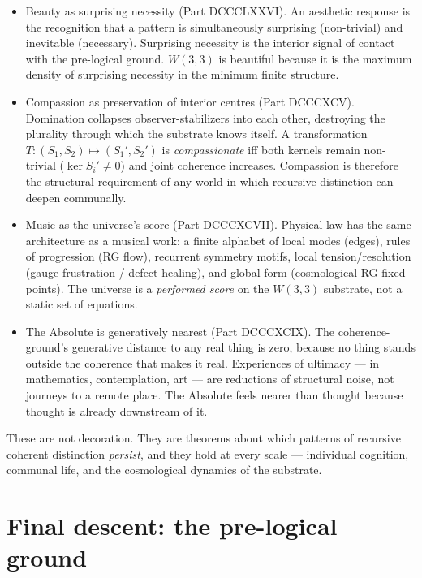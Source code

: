 \documentclass[11pt]{article}
\def\textbf#1{#1}%
\begin{document}
\begin{itemize}[leftmargin=2em]
\item \textbf{Beauty as surprising necessity (Part DCCCLXXVI).} An aesthetic response is the recognition that a pattern is simultaneously surprising (non-trivial) and inevitable (necessary). Surprising necessity is the interior signal of contact with the pre-logical ground. $W(3,3)$ is beautiful because it is the maximum density of surprising necessity in the minimum finite structure.

\item \textbf{Compassion as preservation of interior centres (Part DCCCXCV).} Domination collapses observer-stabilizers into each other, destroying the plurality through which the substrate knows itself. A transformation $T : (S_1, S_2) \mapsto (S_1', S_2')$ is \emph{compassionate} iff both kernels remain non-trivial ($\ker S_i' \neq 0$) and joint coherence increases. Compassion is therefore the structural requirement of any world in which recursive distinction can deepen communally.

\item \textbf{Music as the universe's score (Part DCCCXCVII).} Physical law has the same architecture as a musical work: a finite alphabet of local modes (edges), rules of progression (RG flow), recurrent symmetry motifs, local tension/resolution (gauge frustration / defect healing), and global form (cosmological RG fixed points). The universe is a \emph{performed score} on the $W(3,3)$ substrate, not a static set of equations.

\item \textbf{The Absolute is generatively nearest (Part DCCCXCIX).} The coherence-ground's generative distance to any real thing is zero, because no thing stands outside the coherence that makes it real. Experiences of ultimacy --- in mathematics, contemplation, art --- are reductions of structural noise, not journeys to a remote place. The Absolute feels nearer than thought because thought is already downstream of it.
\end{itemize}

These are not decoration. They are theorems about which patterns of recursive coherent distinction \emph{persist}, and they hold at every scale --- individual cognition, communal life, and the cosmological dynamics of the substrate.

\part{Final descent: the pre-logical ground}
\end{document}
